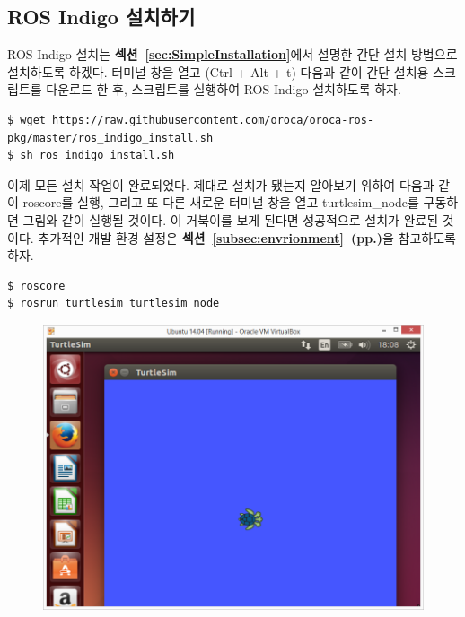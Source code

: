 \subsection{ROS Indigo 설치하기}

ROS Indigo 설치는 \textbf{섹션~\ref{sec:SimpleInstallation}}에서 설명한 간단 설치 방법으로 설치하도록 하겠다. 터미널 창을 열고 (Ctrl + Alt + t) 다음과 같이 간단 설치용 스크립트를 다운로드 한 후, 스크립트를 실행하여 ROS Indigo 설치하도록 하자.

\vspace{\baselineskip}
\begin{lstlisting}[language=ROS]
$ wget https://raw.githubusercontent.com/oroca/oroca-ros-pkg/master/ros_indigo_install.sh
$ sh ros_indigo_install.sh
\end{lstlisting}

\noindent
이제 모든 설치 작업이 완료되었다. 제대로 설치가 됐는지 알아보기 위하여 다음과 같이 roscore를 실행, 그리고 또 다른 새로운 터미널 창을 열고 turtlesim\_node를 구동하면 그림와 같이 실행될 것이다. 이 거북이를 보게 된다면 성공적으로 설치가 완료된 것이다. 추가적인 개발 환경 설정은 \textbf{섹션~\ref{subsec:envrionment}~(pp.\pageref{subsec:envrionment})}을 참고하도록 하자.

\vspace{\baselineskip}
\begin{lstlisting}[language=ROS]
$ roscore
$ rosrun turtlesim turtlesim_node
\end{lstlisting}

\begin{figure}[h]
\centering
\includegraphics[width=0.6\columnwidth]{pictures/chapter3/vm24.png}
\end{figure}

\newpage

